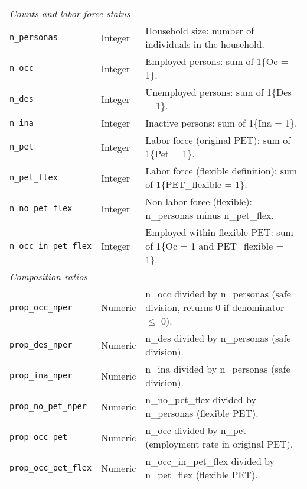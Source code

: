 \documentclass[12pt,a4paper,onecolumn]{article}
\begin{document}
\begin{longtable}{p{4cm} p{2.4cm} p{9.6cm}}
\multicolumn{3}{l}{\emph{Counts and labor force status}}\\
\texttt{n\_personas} & Integer & Household size: number of individuals in the household.\\
\texttt{n\_occ} & Integer & Employed persons: sum of 1\{Oc = 1\}.\\
\texttt{n\_des} & Integer & Unemployed persons: sum of 1\{Des = 1\}.\\
\texttt{n\_ina} & Integer & Inactive persons: sum of 1\{Ina = 1\}.\\
\texttt{n\_pet} & Integer & Labor force (original PET): sum of 1\{Pet = 1\}.\\
\texttt{n\_pet\_flex} & Integer & Labor force (flexible definition): sum of 1\{PET\_flexible = 1\}.\\
\texttt{n\_no\_pet\_flex} & Integer & Non-labor force (flexible): n\_personas minus n\_pet\_flex.\\
\texttt{n\_occ\_in\_pet\_flex} & Integer & Employed within flexible PET: sum of 1\{Oc = 1 and PET\_flexible = 1\}.\\

\multicolumn{3}{l}{\emph{Composition ratios}}\\
\texttt{prop\_occ\_nper} & Numeric & n\_occ divided by n\_personas (safe division, returns 0 if denominator $\le$ 0).\\
\texttt{prop\_des\_nper} & Numeric & n\_des divided by n\_personas (safe division).\\
\texttt{prop\_ina\_nper} & Numeric & n\_ina divided by n\_personas (safe division).\\
\texttt{prop\_no\_pet\_nper} & Numeric & n\_no\_pet\_flex divided by n\_personas (flexible PET).\\
\texttt{prop\_occ\_pet} & Numeric & n\_occ divided by n\_pet (employment rate in original PET).\\
\texttt{prop\_occ\_pet\_flex} & Numeric & n\_occ\_in\_pet\_flex divided by n\_pet\_flex (flexible PET).\\


\end{longtable}
\end{document}
